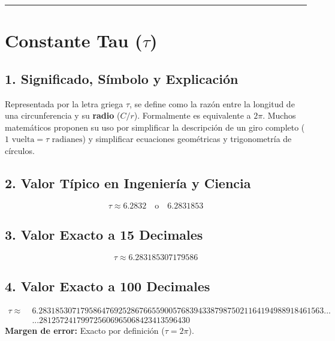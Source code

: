 \documentclass[12pt,a4paper]{article}
\begin{document}
\vspace{0.8cm}
\hrule
\vspace{0.8cm}

\section{Constante Tau ($\tau$)}

\subsection*{1. Significado, Símbolo y Explicación}
Representada por la letra griega $\tau$, se define como la razón entre la longitud de una circunferencia y su \textbf{radio} ($C/r$). Formalmente es equivalente a $2\pi$. Muchos matemáticos proponen su uso por simplificar la descripción de un giro completo ($1\text{ vuelta} = \tau\text{ radianes}$) y simplificar ecuaciones geométricas y trigonometría de círculos.

\subsection*{2. Valor Típico en Ingeniería y Ciencia}
\begin{equation*}
\tau \approx 6.2832 \quad \text{o} \quad 6.2831853
\end{equation*}

\subsection*{3. Valor Exacto a 15 Decimales}
\begin{equation*}
\tau \approx 6.283185307179586
\end{equation*}

\subsection*{4. Valor Exacto a 100 Decimales}
\begin{align*}
\tau \approx \; & 6.28318530717958647692528676655900576839433879875021164194988918461563... \\
& ...281257241799725606965068423413596430
\end{align*}
\textbf{Margen de error:} Exacto por definición ($\tau = 2\pi$).
\end{document}
